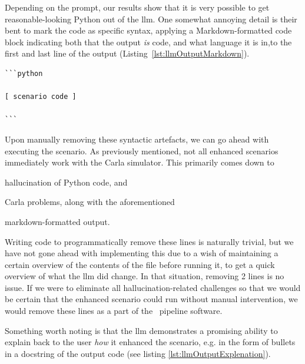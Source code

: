 Depending on the prompt, our results show that it is very possible to get
reasonable-looking Python out of the \acrshort{llm}. One somewhat annoying
detail is their bent to mark the code as specific syntax, applying a Markdown-formatted code block
indicating both that the output \emph{is} code, and what language it is in,to the first and last
line of the output (Listing~\ref{lst:llmOutputMarkdown}).
\begin{lstlisting}[caption={LLM-generated Python code with Markdown syntax. The bracketed part on line 3 has been added for demonstration purposes, removing the actual code for brevity.}, label={lst:llmOutputMarkdown}]
```python

[ scenario code ]

```
\end{lstlisting}

Upon manually removing these syntactic artefacts, we can go ahead with executing
the scenario. As previously mentioned, not all enhanced scenarios immediately work with the Carla
simulator. This primarily comes down to \begin{inparaenum}
    \item hallucination of Python code, and
    \item Carla problems, along with the aforementioned
    \item markdown-formatted output.
\end{inparaenum}

Writing code to programmatically remove these lines is naturally trivial, but we have
not gone ahead with implementing this due to a wish of maintaining a certain overview of the
contents of the file before running it, to get a quick overview of what the \acrshort{llm} did
change. In that situation, removing \num{2} lines is no issue. If we were to eliminate all
hallucination-related challenges so that we would be certain that the enhanced scenario could run
without manual intervention, we would remove these lines as a part of the \hefe~pipeline software.

Something worth noting is that the \acrshort{llm} demonstrates a promising
ability to explain back to the user \emph{how} it enhanced the scenario, e.g. in
the form of bullets in a docstring of the output code (see listing \ref{lst:llmOutputExplenation}).

